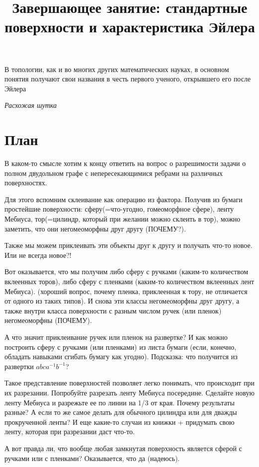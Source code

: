 \documentclass[a4paper,14pt]{extarticle}
\title{Завершающее занятие: стандартные поверхности и характеристика Эйлера}
\date{}
\begin{document}
\maketitle
\vspace{-6em}
\epigraph{В топологии, как и во многих других математических науках, в основном понятия получают свои названия в честь первого ученого, открывшего его после Эйлера}{\textit{Расхожая шутка}}

\section{План}
В каком-то смысле хотим к концу ответить на вопрос о разрешимости задачи о полном двудольном графе с непересекающимися ребрами на различных поверхностях.

Для этого вспомним склеивание как операцию из фактора. Получив из бумаги простейшие поверхности: сферу(=что-угодно, гомеоморфное сфере), ленту Мебиуса, тор(=цилиндр, который при желании можно склеить в тор), можно заметить, что они негомеоморфны друг другу (ПОЧЕМУ?). 

Также мы можем приклеивать эти объекты друг к другу и получать что-то новое. Или не всегда новое?! 

Вот оказывается, что мы получим либо сферу с ручками (каким-то количеством вклеенных торов), либо сферу с пленками (каким-то количеством вклеенных лент Мебиуса). (хороший вопрос, почему пленка, приклеенная к тору, не отличается от одного из таких типов). И снова эти классы негомеоморфны друг другу, а также внутри класса поверхности с разным числом ручек (или пленок) негомеоморфны (ПОЧЕМУ).

А что значит приклеивание ручек или пленок на развертке? И как можно построить сферу с ручками (или пленками) из листа бумаги (если, конечно, обладать навыками сгибать бумагу как угодно). Подсказка: что получится из развертки $abca^{-1}b^{-1}$?

Такое представление поверхностей позволяет легко понимать, что происходит при их разрезании. Попробуйте разрезать ленту Мебиуса посередине. Сделайте новую ленту Мебиуса и разрежьте ее по линии на 1/3 от края. Почему результаты разные? А если то же самое делать для обычного цилиндра или для дважды прокрученной ленты? И еще какие-то случаи из книжки + придумать свою ленту, которая при разрезании даст что-то.

А вот правда ли, что вообще любая замкнутая поверхность является сферой с ручками или с пленками? Оказывается, что да (надеюсь).
\end{document}
